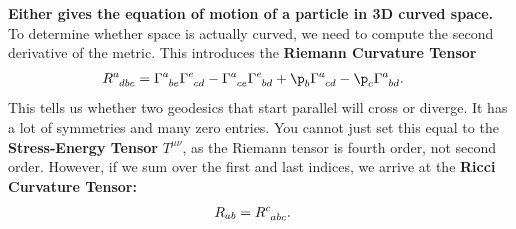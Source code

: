 \documentclass[a4paper, 11pt, normalem]{report}
\begin{document}
\textbf{Either gives the equation of motion of a particle in 3D curved space.}
To determine whether space is actually curved, we need to compute the second derivative of the metric. 
This introduces the \textbf{Riemann Curvature Tensor} 
\begin{align}
    \tensor{R}{^a_{dbc}} &= \tensor{\Gamma}{^a_{be}}\tensor{\Gamma}{^e_{cd}} - \tensor{\Gamma}{^a_{ce}}\tensor{\Gamma}{^e_{bd}} + \p_b\tensor{\Gamma}{^a_{cd}}-\p_c\tensor{\Gamma}{^a_{bd}}.
\end{align}
This tells us whether two geodesics that start parallel will cross or diverge. 
It has a lot of symmetries and many zero entries. 
You cannot just set this equal to the \textbf{Stress-Energy Tensor} $T^{\mu\nu}$, as the Riemann tensor is fourth order, not second order. 
However, if we sum over the first and last indices, we arrive at the \textbf{Ricci Curvature Tensor:}
\begin{align}
    R_{ab} &= \tensor{R}{^c_{abc}}.
\end{align}
\end{document}
